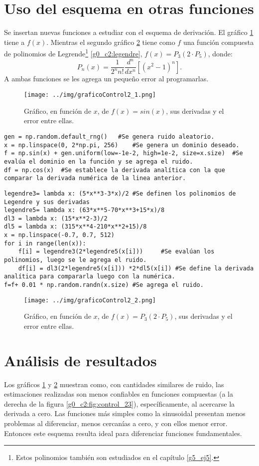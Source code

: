 \documentclass[../portafolio.tex]{subfiles}
\begin{document}
\section{Uso del esquema en otras funciones}
Se insertan nuevas funciones a estudiar con el esquema de derivación. El gráfico \ref{g0_c2:fig:control_21} tiene a $f(x)$. Mientras el segundo gráfico \ref{g0_c2:fig:control_22} tiene como $f$ una función compuesta de polinomios de Legrende\footnote{Estos polinomios también son estudiados en el capítulo \ref{g5_ej5}.} \eqref{g0_c2:legendre}, $f(x)=P_3(2\cdot P_5)$, donde:
\begin{equation}\label{g0_c2:legendre}
P_n(x)=\frac{1}{2^n n!}\frac{d^n}{dx^n}[(x^2-1)^n].
\end{equation}
A ambas funciones se les agrega un pequeño error al programarlas. 
\begin{figure}
\centering
\texttt{[image: ../img/graficoControl2\_1.png]} 
\caption{Gráfico, en función de $x$, de $f(x)=sin(x)$, sus derivadas y el error entre ellas.}\label{g0_c2:fig:control_21}
\end{figure}
\begin{verbatim}
gen = np.random.default_rng()	#Se genera ruido aleatorio.
x = np.linspace(0, 2*np.pi, 256)	#Se genera un dominio deseado.
f = np.sin(x) + gen.uniform(low=-1e-2, high=1e-2, size=x.size)	#Se evalúa el dominio en la función y se agrega el ruido.
df = np.cos(x)	#Se establece la derivada analítica con la que comparar la derivada numérica de la linea anterior.
\end{verbatim}
\begin{verbatim}
legendre3= lambda x: (5*x**3-3*x)/2	#Se definen los polinomios de Legendre y sus derivadas
legendre5= lambda x: (63*x**5-70*x**3+15*x)/8
dl3 = lambda x: (15*x**2-3)/2
dl5 = lambda x: (315*x**4-210*x**2+15)/8
x = np.linspace(-0.7, 0.7, 512)
for i in range(len(x)):
	f[i] = legendre3(2*legendre5(x[i])) 	#Se evalúan los polinomios, luego se le agrega el ruido.
	df[i] = dl3(2*legendre5(x[i])) *2*dl5(x[i])	#Se define la derivada analítica para compararla luego con la numérica.
f=f+ 0.01 * np.random.randn(x.size)	#Se agrega el ruido.
\end{verbatim}
\begin{figure}
\centering
\texttt{[image: ../img/graficoControl2\_2.png]} 
\caption{Gráfico, en función de $x$, de $f(x)=P_3(2\cdot P_5)$, sus derivadas y el error entre ellas.}\label{g0_c2:fig:control_22}
\end{figure}
\section{Análisis de resultados}
Los gráficos \ref{g0_c2:fig:control_21} y \ref{g0_c2:fig:control_22} muestran como, con cantidades similares de ruido, las estimaciones realizadas son menos confiables en funciones compuestas (a la derecha de la figura \ref{g0_c2:fig:control_23}), específicamente, al acercarse la derivada a cero. Las funciones más simples como la sinusoidal presentan menos problemas al diferenciar, menos cercanías a cero, y con ellos menor error. Entonces este esquema resulta ideal para diferenciar funciones fundamentales.
\end{document}
